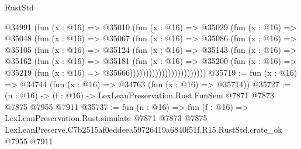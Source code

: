 \begin{lexlean}{RustStd}
\begin{coremodule}
                        @34991
                          (fun (x : @16) =>
                          @35010
                            (fun (x : @16) =>
                            @35029
                              (fun (x : @16) =>
                              @35048
                                (fun (x : @16) =>
                                @35067
                                  (fun (x : @16) =>
                                  @35086
                                    (fun (x : @16) =>
                                    @35105
                                      (fun (x : @16) =>
                                      @35124
                                        (fun (x : @16) =>
                                        @35143
                                          (fun (x : @16) =>
                                          @35162
                                            (fun (x : @16) =>
                                            @35181
                                              (fun (x : @16) =>
                                              @35200
                                                (fun (x : @16) =>
                                                @35219
                                                  (fun (x : @16) => @35666))))))))))))))))))))))))
@35719 := fun (x : @16) => @34744 (fun (x : @16) => @34763 (fun (x : @16) => @35714))
@35727 := (n : @16) -> (f : @16) -> LexLeanPreservation.Rust.FunSem @7871 @7873 @7875 @7955 @7911
@35737 := fun (n : @16) =>
  fun (f : @16) =>
  LexLeanPreservation.Rust.simulate
    @7871
    @7873
    @7875
    LexLeanPreserve.C7b2515af0eddeea59726419a6840f51f.R15.RustStd.crate_ok
    @7955
    @7911
\end{coremodule}
\end{lexlean}
